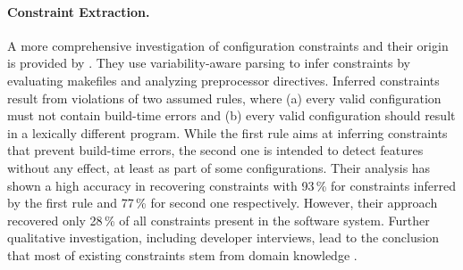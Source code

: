 \paragraph{Constraint Extraction.} 
A more comprehensive investigation of configuration
constraints and their origin is provided by \cite{nadi_mining_2014,nadi_where_2015}. They use variability-aware parsing to infer constraints by
evaluating makefiles and  analyzing preprocessor directives. Inferred
constraints result from violations of two assumed rules, where (a) every valid
configuration must not contain build-time errors and (b) every valid
configuration should result in a lexically different program. While the
first rule aims at inferring constraints that prevent build-time errors, the
second one is intended to detect features without any effect, at least as part
of some configurations. Their analysis has shown a high accuracy
in recovering constraints with 93\,\% for constraints inferred by the first rule
and 77\,\% for second one respectively. However, their approach
recovered only 28\,\% of all constraints present in the software system.
Further qualitative investigation, including developer interviews, lead to
the conclusion that most of existing constraints stem from domain knowledge
\citep{nadi_where_2015}.

